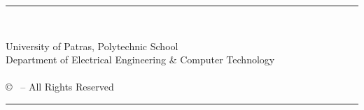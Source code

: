 \pagestyle{empty}

\vspace*{\fill}
\noindent \hspace{2cm} \rule{12.7cm}{0.4pt}\\
\vspace{-1.7em}
\begin{flushleft}
	\hspace*{30mm}University of Patras, Polytechnic School\\
	\hspace*{30mm}Department of Electrical Engineering \& Computer Technology\\
	\hspace*{30mm}{\nomme}\\
	\hspace*{30mm}© \monthyear \ -- All Rights Reserved\\
\end{flushleft}
\vspace{-1.2em}
\noindent \hspace{2cm} \rule{12.7cm}{0.4pt}
